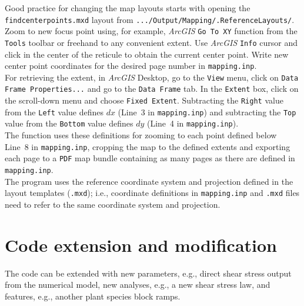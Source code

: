 Good practice for changing the map layouts starts with opening the \texttt{find{\myUnderscore}center{\myUnderscore}points.mxd} layout from \texttt{.../Output/Mapping/.ReferenceLayouts/}. Zoom to new focus point using, for example, \textit{ArcGIS} \texttt{Go To XY} function from the \texttt{Tools} toolbar or freehand to any convenient extent. Use \textit{ArcGIS} \texttt{Info} cursor and click in the center of the reticule to obtain the current center point. Write new center point coordinates for the desired page number in \texttt{mapping.inp}.\\
For retrieving the extent, in \textit{ArcGIS} Desktop, go to the \texttt{View} menu, click on \texttt{Data Frame Properties...} and go to the \texttt{Data Frame} tab. In the \texttt{Extent} box, click on the scroll-down menu and choose \texttt{Fixed Extent}. Subtracting the \texttt{Right} value from the \texttt{Left} value defines $dx$ (Line~3 in \texttt{mapping.inp}) and subtracting the \texttt{Top} value from the \texttt{Bottom} value defines $dy$ (Line~4 in \texttt{mapping.inp}).\\
The  function uses these definitions for zooming to each point defined below Line~8 in \texttt{mapping.inp}, cropping the map to the defined extents and exporting each page to a \texttt{PDF} map bundle containing as many pages as there are defined in \texttt{mapping.inp}.\\
The program uses the reference coordinate system and projection defined in the layout templates (\texttt{.mxd}); i.e., coordinate definitions in \texttt{mapping.inp} and \texttt{.mxd} files need to refer to the same coordinate system and projection.



\section{Code extension and modification} \label{sec:code}
The code can be extended with new parameters, e.g., direct shear stress output from the numerical model, new analyses, e.g., a new shear stress law, and features, e.g., another plant species block ramps.

